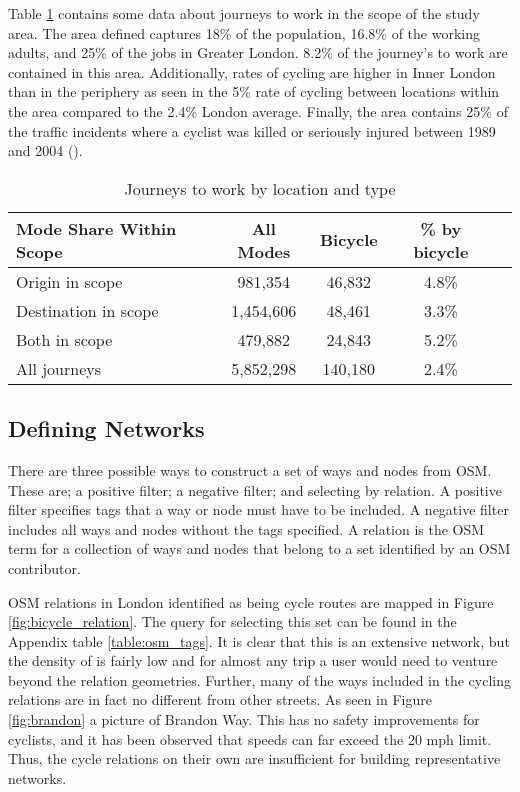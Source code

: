 Table \ref{table:commute_data} contains some data about journeys to work in the scope of the study area. The area defined captures 18\% of the population, 16.8\% of the working adults, and 25\% of the jobs in Greater London. 8.2\% of the journey's to work are contained in this area. Additionally, rates of cycling are higher in Inner London than in the periphery as seen in the 5\% rate of cycling between locations within the area compared to the 2.4\% London average. Finally, the area contains 25\% of the traffic incidents where a cyclist was killed or seriously injured between 1989 and 2004 (\cite{cyclistksi}). 
 
\begin{table}[]
\centering
\begin{tabular}{lcccl}
 Mode Share Within Scope & All Modes & Bicycle & \% by bicycle &  \\
 \hline
 Origin in scope &  981,354 & 46,832 & 4.8\% &  \\
 Destination in scope & 1,454,606 & 48,461 & 3.3\% &  \\
 Both in scope & 479,882 & 24,843 & 5.2\% & \\
 All journeys & 5,852,298 & 140,180 & 2.4\% \\ 
\end{tabular}
\caption{Journeys to work by location and type}
\label{table:commute_data}
\end{table}

\subsection{Defining Networks}

There are three possible ways to construct a set of ways and nodes from OSM. These are; a positive filter; a negative filter; and selecting by relation. A positive filter specifies tags that a way or node must have to be included. A negative filter includes all ways and nodes without the tags specified. A relation is the OSM term for a collection of ways and nodes that belong to a set identified by an OSM contributor. 

OSM relations in London identified as being cycle routes are mapped in Figure \ref{fig:bicycle_relation}. The query for selecting this set can be found in the Appendix table \ref{table:osm_tags}. It is clear that this is an extensive network, but the density of is fairly low and for almost any trip a user would need to venture beyond the relation geometries. Further, many of the ways included in the cycling relations are in fact no different from other streets. As seen in Figure \ref{fig:brandon} a picture of Brandon Way. This has no safety improvements for cyclists, and it has been observed that speeds can far exceed the 20 mph limit. Thus, the cycle relations on their own are insufficient for building representative networks. 

